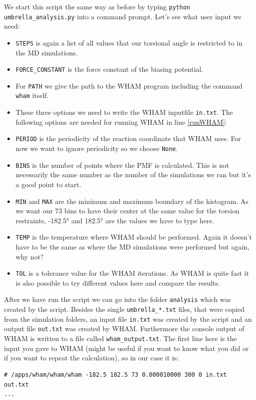 \documentclass[a4paper,11pt]{scrartcl}
\begin{document}
We start this script the same way as before by typing \texttt{python umbrella\_analysis.py} into a command prompt. Let's see what user input we need:
\begin{itemize}
	\item \texttt{STEPS} is again a list of all values that our torsional angle is restricted to in the MD simulations. 
	\item \texttt{FORCE\_CONSTANT} is the force constant of the biasing potential. 
	\item For \texttt{PATH} we give the path to the WHAM program including the command \texttt{wham} itself. 
	\item These three options we need to write the WHAM inputfile \texttt{in.txt}. The following options are needed for running WHAM in line \ref{runWHAM}:
	\item \texttt{PERIOD} is the periodicity of the reaction coordinate that WHAM uses. For now we want to ignore periodicity so we choose \texttt{None}.
	\item \texttt{BINS} is the number of points where the PMF is calculated. This is not necessarily the same number as the number of the simulations we ran but it's a good point to start.
	\item \texttt{MIN} and \texttt{MAX} are the minimum and maximum boundary of the histogram. As we want our 73 bins to have their center at the same value for the torsion restraints, -182.5° and 182.5° are the values we have to type here.
	\item \texttt{TEMP} is the temperature where WHAM should be performed. Again it doesn't have to be the same as where the MD simulations were performed but again, why not?
	\item \texttt{TOL} is a tolerance value for the WHAM iterations. As WHAM is quite fast it is also possible to try different values here and compare the results.
\end{itemize}

After we have run the script we can go into the folder \texttt{analysis} which was created by the script. Besides the single \texttt{umbrella\_*.txt} files, that were copied from the simulation folders, an input file \texttt{in.txt} was created by the script and an output file \texttt{out.txt} was created by WHAM. Furthermore the console output of WHAM is written to a file called \texttt{wham\_output.txt}. The first line here is the input you gave to WHAM (might be useful if you want to know what you did or if you want to repeat the calculation), so in our case it is:
\begin{lstlisting}[frame=single]
# /apps/wham/wham/wham -182.5 182.5 73 0.000010000 300 0 in.txt out.txt
...
\end{lstlisting}
\end{document}
